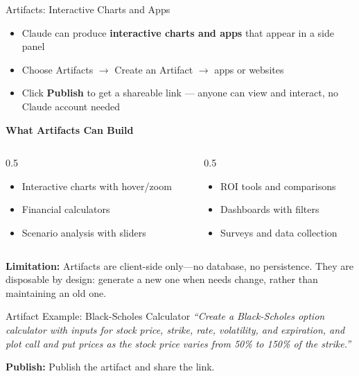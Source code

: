 \documentclass[aspectratio=169]{beamer}
\begin{document}
\begin{frame}{Artifacts: Interactive Charts and Apps}

\begin{itemize}
  \item Claude can produce \textbf{interactive charts and apps} that appear in a side panel
  \item Choose Artifacts $\rightarrow$ Create an Artifact $\rightarrow$ apps or websites
  \item Click \textbf{Publish} to get a shareable link --- anyone can view and interact, no Claude account needed
\end{itemize}

\vspace{0.3cm}

\textbf{What Artifacts Can Build}
\begin{columns}[T]
\begin{column}{0.5\textwidth}
\begin{itemize}\small
  \item Interactive charts with hover/zoom
  \item Financial calculators
  \item Scenario analysis with sliders
\end{itemize}
\end{column}
\begin{column}{0.5\textwidth}
\begin{itemize}\small
  \item ROI tools and comparisons
  \item Dashboards with filters
  \item Surveys and data collection
\end{itemize}
\end{column}
\end{columns}

\vspace{0.2cm}
\small\textbf{Limitation:} Artifacts are client-side only---no database, no persistence.  They are \alert{disposable by design}: generate a new one when needs change, rather than maintaining an old one.
\end{frame}

\begin{frame}{Artifact Example: Black-Scholes Calculator}
\textit{``Create a Black-Scholes option calculator with inputs for stock price, strike, rate, volatility, and expiration, and plot call and put prices as the stock price varies from 50\% to 150\% of the strike.''}

\vspace{0.3cm}
\textbf{Publish:} Publish the artifact and share the link.
\end{frame}
\end{document}
